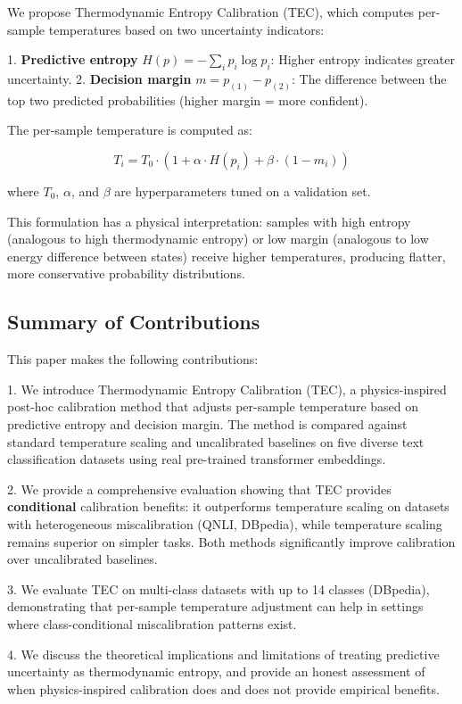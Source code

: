 \documentclass[11pt,letterpaper]{article}
\begin{document}
We propose Thermodynamic Entropy Calibration (TEC), which computes per-sample temperatures based on two uncertainty indicators:

1. \textbf{Predictive entropy} $H(p) = -\sum_i p_i \log p_i$: Higher entropy indicates greater uncertainty.
2. \textbf{Decision margin} $m = p_{(1)} - p_{(2)}$: The difference between the top two predicted probabilities (higher margin = more confident).

The per-sample temperature is computed as:

$$T_i = T_0 \cdot (1 + \alpha \cdot H(p_i) + \beta \cdot (1 - m_i))$$

where $T_0$, $\alpha$, and $\beta$ are hyperparameters tuned on a validation set.

This formulation has a physical interpretation: samples with high entropy (analogous to high thermodynamic entropy) or low margin (analogous to low energy difference between states) receive higher temperatures, producing flatter, more conservative probability distributions.

\subsection{Summary of Contributions}

This paper makes the following contributions:

1. We introduce Thermodynamic Entropy Calibration (TEC), a physics-inspired post-hoc calibration method that adjusts per-sample temperature based on predictive entropy and decision margin. The method is compared against standard temperature scaling and uncalibrated baselines on five diverse text classification datasets using real pre-trained transformer embeddings.

2. We provide a comprehensive evaluation showing that TEC provides \textbf{conditional} calibration benefits: it outperforms temperature scaling on datasets with heterogeneous miscalibration (QNLI, DBpedia), while temperature scaling remains superior on simpler tasks. Both methods significantly improve calibration over uncalibrated baselines.

3. We evaluate TEC on multi-class datasets with up to 14 classes (DBpedia), demonstrating that per-sample temperature adjustment can help in settings where class-conditional miscalibration patterns exist.

4. We discuss the theoretical implications and limitations of treating predictive uncertainty as thermodynamic entropy, and provide an honest assessment of when physics-inspired calibration does and does not provide empirical benefits.
\end{document}
